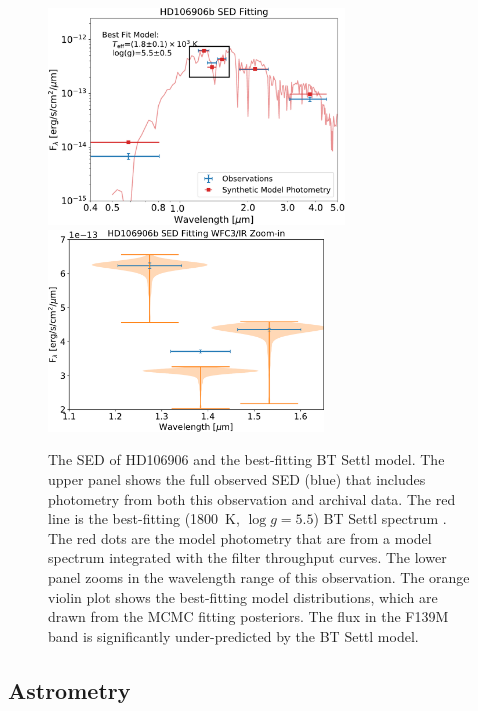 \documentclass[twocolumn]{aastex62}
\begin{document}
\begin{figure}
  \centering
\includegraphics[width=0.7\textwidth]{figures/SEDfit.pdf}  \includegraphics[width=0.65\textwidth]{figures/SEDfit_zoomin.pdf}
  \caption[The SED of HD106906 and the best-fitting BT Settl model.]{The SED of HD106906 and the best-fitting BT Settl model. The upper panel shows the full observed SED (blue) that includes photometry from both this observation and archival data. The red line is the best-fitting (1800~K, $\log g=5.5$) BT Settl spectrum \citep[rebinned to $R\sim100$ in a flux conserved manner, ][]{Allard2012}. The red dots are the model photometry that are from a model spectrum integrated with the filter throughput curves. The lower panel zooms in the wavelength range of this observation. The orange violin plot shows the best-fitting model distributions, which are drawn from the MCMC fitting posteriors. The flux in the F139M band is significantly under-predicted by the BT Settl model.}
  \label{fig:SED}
\end{figure}

\subsection{Astrometry}
\label{sec:astrometry}
\end{document}
